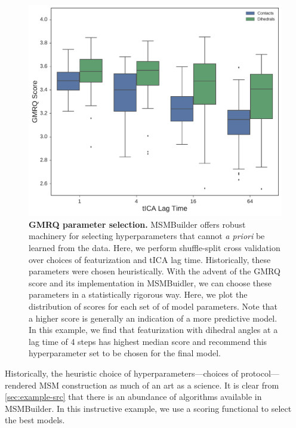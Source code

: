 \begin{figure}[htbp]
\centering
\includegraphics[width=\linewidth]{2-gmrq/plot}
\caption{\textbf{GMRQ parameter selection.}
    MSMBuilder offers robust machinery for selecting hyperparameters that
    cannot \emph{a priori} be learned from the data. Here, we perform
    shuffle-split cross validation over choices of featurization and tICA
    lag time. Historically, these parameters were chosen heuristically.
    With the advent of the GMRQ score and its implementation in MSMBuidler,
    we can choose these parameters in a statistically rigorous way. Here,
    we plot the distribution of scores for each set of of model parameters.
    Note that a higher score is generally an indication of a more predictive
    model. In this example, we find that featurization with dihedral angles
    at a lag time of 4 steps has highest median score and recommend this
    hyperparameter set to be chosen for the final model.
}
\label{fig:gmrq}
\end{figure}

Historically, the heuristic choice of hyperparameters---choices of
protocol---rendered MSM construction as much of an art as a science. It is
clear from \cref{sec:example-src} that there is an abundance of algorithms
available in MSMBuilder. In this instructive example, we use a
scoring functional to select the best models.


